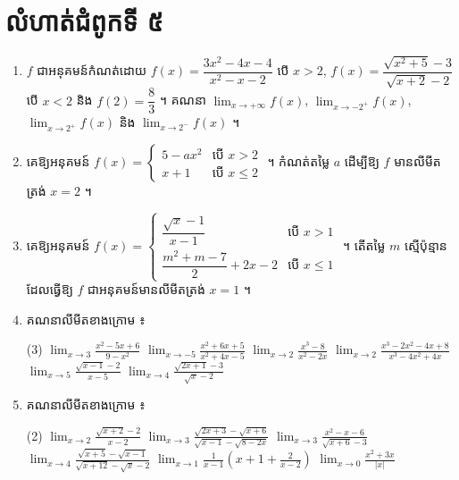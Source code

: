 \section*{លំហាត់ជំពូកទី ៥}
\begin{enumerate}[1]
  \item $f$ ជាអនុគមន៍កំណត់ដោយ $f(x) = \dfrac{3x^2 - 4x - 4}{x^2 - x - 2}$ បើ $x > 2$, $f(x) = \dfrac{\sqrt{x^2 + 5} - 3}{\sqrt{x + 2} - 2}$ បើ $x < 2$ និង $f(2) = \dfrac{8}{3}$ ។ គណនា $\displaystyle\lim_{x \to +\infty} f(x)$, $\displaystyle\lim_{x \to -2^+} f(x)$, $\displaystyle\lim_{x \to 2^+} f(x)$ និង $\displaystyle\lim_{x \to 2^-} f(x)$ ។
  \item គេឱ្យអនុគមន៍ $f(x) = \begin{cases} 5 - ax^2 & \text{បើ } x > 2\\ x + 1 & \text{បើ } x \le 2 \end{cases}$ ។ កំណត់តម្លៃ $a$ ដើម្បីឱ្យ $f$ មានលីមីតត្រង់ $x = 2$ ។
  \item គេឱ្យអនុគមន៍ $f(x) = \begin{cases} \dfrac{\sqrt{x} - 1}{x - 1} & \text{បើ } x > 1\\ \dfrac{m^2 + m - 7}{2} + 2x - 2 & \text{បើ } x \le 1 \end{cases}$ ។ តើតម្លៃ $m$ ស្មើប៉ុន្មានដែលធ្វើឱ្យ $f$ ជាអនុគមន៍មានលីមីតត្រង់ $x = 1$ ។
  \item គណនាលីមីតខាងក្រោម ៖
  \begin{tasks}(3)
    \task $\displaystyle\lim_{x \to 3}\frac{x^2 - 5x + 6}{9 - x^2}$
    \task $\displaystyle\lim_{x \to -5}\frac{x^2 + 6x + 5}{x^2 + 4x - 5}$
    \task $\displaystyle\lim_{x \to 2}\frac{x^3 - 8}{x^2 - 2x}$
    \task $\displaystyle\lim_{x \to 2}\frac{x^3 - 2x^2 - 4x + 8}{x^3 - 4x^2 + 4x}$
    \task $\displaystyle\lim_{x \to 5}\frac{\sqrt{x - 1} - 2}{x - 5}$
    \task $\displaystyle\lim_{x \to 4}\frac{\sqrt{2x + 1} - 3}{\sqrt{x} - 2}$
  \end{tasks}
  \item គណនាលីមីតខាងក្រោម ៖
  \begin{tasks}(2)
    \task $\displaystyle\lim_{x \to 2}\frac{\sqrt{x + 2} - 2}{x - 2}$
    \task $\displaystyle\lim_{x \to 3}\frac{\sqrt{2x + 3} - \sqrt{x + 6}}{\sqrt{x - 1} - \sqrt{8 - 2x}}$
    \task $\displaystyle\lim_{x \to 3}\frac{x^2 - x - 6}{\sqrt{x + 6} - 3}$
    \task $\displaystyle\lim_{x \to 4}\frac{\sqrt{x + 5} - \sqrt{x - 1}}{\sqrt{x + 12} - \sqrt{x} - 2}$
    \task $\displaystyle\lim_{x \to 1}\frac{1}{x - 1}\left(x + 1 + \frac{2}{x - 2}\right)$
    \task $\displaystyle\lim_{x \to 0}\frac{x^2 + 3x}{|x|}$

\end{tasks}
\end{enumerate}
